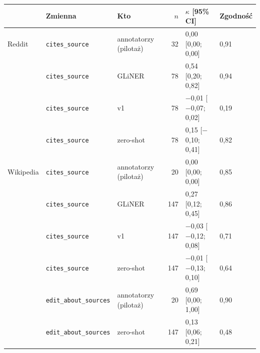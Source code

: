\begin{tabular}{lllrll}
\toprule
 & Zmienna & Kto & $n$ & $\kappa$ [95\% CI] & Zgodność \\
\midrule
Reddit & \texttt{cites\_source} & annotatorzy (pilotaż) & 32 & 0{,}00 [0{,}00; 0{,}00] & 0{,}91 \\
 & \texttt{cites\_source} & GLiNER & 78 & 0{,}54 [0{,}20; 0{,}82] & 0{,}94 \\
 & \texttt{cites\_source} & v1 & 78 & $-$0{,}01 [$-$0{,}07; 0{,}02] & 0{,}19 \\
 & \texttt{cites\_source} & zero-shot & 78 & 0{,}15 [$-$0{,}10; 0{,}41] & 0{,}82 \\
\midrule
Wikipedia & \texttt{cites\_source} & annotatorzy (pilotaż) & 20 & 0{,}00 [0{,}00; 0{,}00] & 0{,}85 \\
 & \texttt{cites\_source} & GLiNER & 147 & 0{,}27 [0{,}12; 0{,}45] & 0{,}86 \\
 & \texttt{cites\_source} & v1 & 147 & $-$0{,}03 [$-$0{,}12; 0{,}08] & 0{,}71 \\
 & \texttt{cites\_source} & zero-shot & 147 & $-$0{,}01 [$-$0{,}13; 0{,}10] & 0{,}64 \\
\midrule
 & \texttt{edit\_about\_sources} & annotatorzy (pilotaż) & 20 & 0{,}69 [0{,}00; 1{,}00] & 0{,}90 \\
 & \texttt{edit\_about\_sources} & zero-shot & 147 & 0{,}13 [0{,}06; 0{,}21] & 0{,}48 \\
\bottomrule
\end{tabular}
